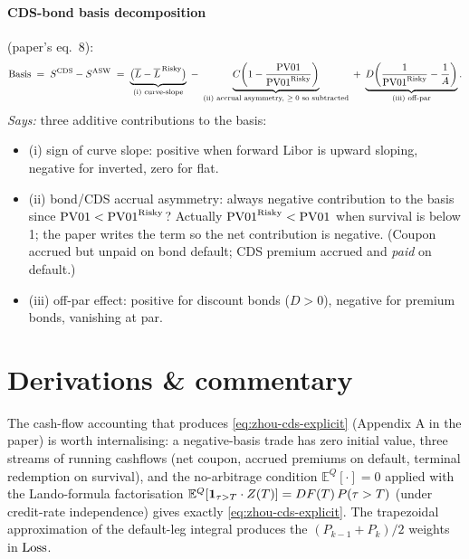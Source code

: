 \documentclass[11pt,a4paper]{article}
\begin{document}
\paragraph{CDS-bond basis decomposition} (paper's eq.~8):
\begin{equation}\label{eq:zhou-basis}
  \mathrm{Basis} \;=\; S^{\mathrm{CDS}} - S^{\mathrm{ASW}}
          \;=\; \underbrace{\bigl( \overline L - \overline L^{\,\text{Risky}} \bigr)}_{\text{(i) curve-slope}}
          \;-\; \underbrace{C \!\left(1 - \frac{\mathrm{PV01}}{\mathrm{PV01}^{\text{Risky}}}\right)}_{\text{(ii) accrual asymmetry, $\ge 0$ so subtracted}}
          \;+\; \underbrace{D \!\left(\frac{1}{\mathrm{PV01}^{\text{Risky}}} - \frac{1}{A}\right)}_{\text{(iii) off-par}}.
\end{equation}
\textit{Says:} three additive contributions to the basis:
\begin{itemize}[noitemsep]
  \item (i) sign of curve slope: positive when forward Libor is upward
        sloping, negative for inverted, zero for flat.
  \item (ii) bond/CDS accrual asymmetry: always negative
        contribution to the basis since
        $\mathrm{PV01} < \mathrm{PV01}^{\text{Risky}}$? Actually $\mathrm{PV01}^{\text{Risky}} < \mathrm{PV01}$
        when survival is below 1; the paper writes the term so the
        net contribution is negative. (Coupon accrued but unpaid on
        bond default; CDS premium accrued and \emph{paid} on default.)
  \item (iii) off-par effect: positive for discount bonds ($D > 0$),
        negative for premium bonds, vanishing at par.
\end{itemize}

\section{Derivations \& commentary}

\begin{commentary}
The cash-flow accounting that produces \eqref{eq:zhou-cds-explicit}
(Appendix A in the paper) is worth internalising: a negative-basis
trade has zero initial value, three streams of running cashflows
(net coupon, accrued premiums on default, terminal redemption
on survival), and the no-arbitrage condition $\mathbb{E}^Q[\cdot] = 0$
applied with the Lando-formula factorisation
$\mathbb{E}^Q[\mathbf{1}_{\tau > T} \cdot Z(T)] = DF(T)\, P(\tau > T)$
(under credit-rate independence) gives exactly
\eqref{eq:zhou-cds-explicit}. The trapezoidal approximation of the
default-leg integral produces the $(P_{k-1} + P_k)/2$ weights in
$\mathrm{Loss}$.
\end{commentary}
\end{document}
